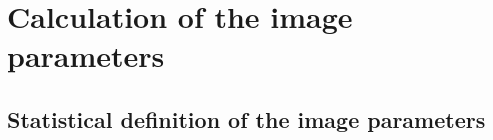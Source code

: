 
\chapter{Calculation of the image parameters}
\label{appendix:image}

\section{Statistical definition of the image parameters}

